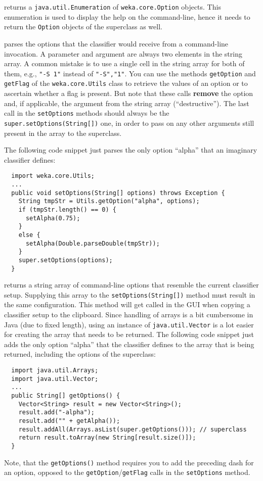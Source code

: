 returns a \texttt{java.util.Enumeration} of \texttt{weka.core.Option} objects.
This enumeration is used to display the help on the command-line, hence it needs
to return the \texttt{Option} objects of the superclass as well.

parses the options that the classifier would receive from a command-line
invocation. A parameter and argument are always two elements in the string
array. A common mistake is to use a single cell in the string array for both of
them, e.g., \texttt{"-S 1"} instead of \texttt{"-S","1"}. You can use the
methods \texttt{getOption} and \texttt{getFlag} of the \texttt{weka.core.Utils}
class to retrieve the values of an option or to ascertain whether a flag is
present. But note that these calls \textbf{remove} the option and, if
applicable, the argument from the string array (``destructive''). The last call
in the \texttt{setOptions} methods should always be the
\texttt{super.setOptions(String[])} one, in order to pass on any other arguments
still present in the array to the superclass.

\clearpage

The following code snippet just parses the only option ``alpha'' that an
imaginary classifier defines:
{\small \begin{verbatim}
  import weka.core.Utils;
  ...
  public void setOptions(String[] options) throws Exception {
    String tmpStr = Utils.getOption("alpha", options);
    if (tmpStr.length() == 0) {
      setAlpha(0.75);
    }
    else {
      setAlpha(Double.parseDouble(tmpStr));
    }
    super.setOptions(options);
  }
\end{verbatim}}

returns a string array of command-line options that resemble the current
classifier setup. Supplying this array to the \texttt{setOptions(String[])}
method must result in the same configuration. This method will get called in the
GUI when copying a classifier setup to the clipboard. Since handling of arrays
is a bit cumbersome in Java (due to fixed length), using an instance of
\texttt{java.util.Vector} is a lot easier for creating the array that needs to
be returned. The following code snippet just adds the only option ``alpha'' that
the classifier defines to the array that is being returned, including the
options of the superclass:
\begin{verbatim}
  import java.util.Arrays;
  import java.util.Vector;
  ...
  public String[] getOptions() {
    Vector<String> result = new Vector<String>();
    result.add("-alpha");
    result.add("" + getAlpha());
    result.addAll(Arrays.asList(super.getOptions())); // superclass
    return result.toArray(new String[result.size()]);
  }
\end{verbatim}
Note, that the \texttt{getOptions()} method requires you to add the preceding
dash for an option, opposed to the \texttt{getOption}/\texttt{getFlag} calls in
the \texttt{setOptions} method.

